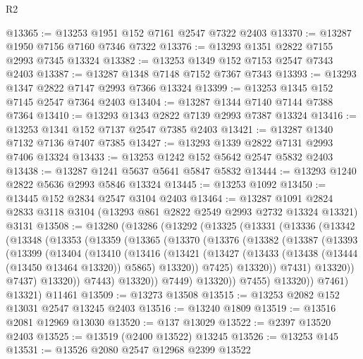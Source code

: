 \begin{lexlean}{R2}
\begin{coremodule}
@13365 := @13253 @1951 @152 @7161 @2547 @7322 @2403
@13370 := @13287 @1950 @7156 @7160 @7346 @7322
@13376 := @13293 @1351 @2822 @7155 @2993 @7345 @13324
@13382 := @13253 @1349 @152 @7153 @2547 @7343 @2403
@13387 := @13287 @1348 @7148 @7152 @7367 @7343
@13393 := @13293 @1347 @2822 @7147 @2993 @7366 @13324
@13399 := @13253 @1345 @152 @7145 @2547 @7364 @2403
@13404 := @13287 @1344 @7140 @7144 @7388 @7364
@13410 := @13293 @1343 @2822 @7139 @2993 @7387 @13324
@13416 := @13253 @1341 @152 @7137 @2547 @7385 @2403
@13421 := @13287 @1340 @7132 @7136 @7407 @7385
@13427 := @13293 @1339 @2822 @7131 @2993 @7406 @13324
@13433 := @13253 @1242 @152 @5642 @2547 @5832 @2403
@13438 := @13287 @1241 @5637 @5641 @5847 @5832
@13444 := @13293 @1240 @2822 @5636 @2993 @5846 @13324
@13445 := @13253 @1092
@13450 := @13445 @152 @2834 @2547 @3104 @2403
@13464 := @13287
    @1091
    @2824
    @2833
    @3118
    @3104
    (@13293 @861 @2822 @2549 @2993 @2732 @13324 @13321)
    @3131
@13508 := @13280
    (@13286
      (@13292
        (@13325
          (@13331
            (@13336
              (@13342
                (@13348
                  (@13353
                    (@13359
                      (@13365
                        (@13370
                          (@13376
                            (@13382
                              (@13387
                                (@13393
                                  (@13399
                                    (@13404
                                      (@13410
                                        (@13416
                                          (@13421
                                            (@13427
                                              (@13433
                                                (@13438 (@13444 (@13450 @13464 @13320)) @5865)
                                                @13320))
                                            @7425)
                                          @13320))
                                      @7431)
                                    @13320))
                                @7437)
                              @13320))
                          @7443)
                        @13320))
                    @7449)
                  @13320))
              @7455)
            @13320))
        @7461)
      @13321)
    @11461
@13509 := @13273 @13508
@13515 := @13253 @2082 @152 @13031 @2547 @13245 @2403
@13516 := @13240 @1809
@13519 := @13516 @2081 @12969 @13030
@13520 := @137 @13029
@13522 := @2397 @13520 @2403
@13525 := @13519 (@2400 @13522) @13245
@13526 := @13253 @145
@13531 := @13526 @2080 @2547 @12968 @2399 @13522

\end{coremodule}
\end{lexlean}
